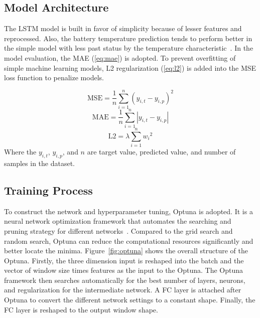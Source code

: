 \subsection{Model Architecture}

The LSTM model is built in favor of simplicity because of lesser features and reprocessed. 
Also, the battery temperature prediction tends to perform better in the simple model with less past status by the temperature characteristic~\cite{fang-2012,jaliliantabar2022prediction}. 
In the model evaluation, the \gls{MAE} (\ref{eq:mae}) is adopted. 
To prevent overfitting of simple machine learning models, L2 regularization (\ref{eq:l2}) is added into the \gls{MSE} loss function to penalize models. 

\begin{equation}
\label{eq:mse}
    \text{MSE}=\frac{1}{n}\sum_{i=1}^{n}(\mathit{y_{i,t}-y_{i,p}})^2
\end{equation}
\begin{equation}
    \label{eq:mae}
    \text{MAE}=\frac{1}{n}\sum_{i=1}^{n}|\mathit{y_{i,t}-y_{i,p}}|
\end{equation}
\begin{equation}
\label{eq:l2}
\text{L2}=\lambda \sum_{i=1}^{n}\mathit{w_i}^{2}
\end{equation}
Where the $y_{i,t}$, $y_{i,p}$, and $n$ are target value, predicted value, and number of samples in the dataset.


\subsection{Training Process}

To construct the network and hyperparameter tuning, Optuna is adopted. 
It is a neural network optimization framework that automates the searching and pruning strategy for different networks~\cite{optuna_2019}. 
Compared to the grid search and random search, Optuna can reduce the computational resources significantly and better locate the minima. 
Figure~\ref{fig:optuna} shows the overall structure of the Optuna. 
Firstly, the three dimension input is reshaped into the batch and the vector of window size times features as the input to the Optuna. 
The Optuna framework then searches automatically for the best number of layers, neurons, and regularization for the intermediate network. 
A \gls{FC} layer is attached after Optuna to convert the different network settings to a constant shape. 
Finally, the \gls{FC} layer is reshaped to the output window shape. 

